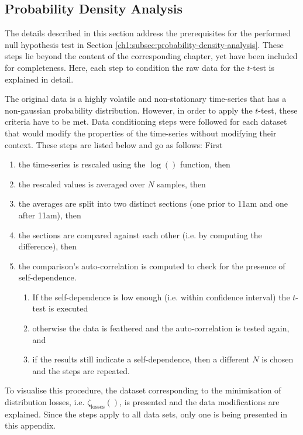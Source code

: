 \subsection{Probability Density Analysis}
\label{appx-a:ch1:probability-density-analysis}

The details described in this section address the prerequisites for the performed null hypothesis test in Section \ref{ch1:subsec:probability-density-analysis}.
These steps lie beyond the content of the corresponding chapter, yet have been included for completeness.
Here, each step to condition the raw data for the $t$-test is explained in detail.

The original data is a highly volatile and non-stationary time-series that has a non-gaussian probability distribution.
However, in order to apply the $t$-test, these criteria have to be met.
Data conditioning steps were followed for each dataset that would modify the properties of the time-series without modifying their context.
These steps are listed below and go as follows: First

\begin{enumerate}
	\item the time-series is rescaled using the $\log()$ function, then
	\item the rescaled values is averaged over $N$ samples, then
	\item the averages are split into two distinct sections (one prior to 11am and one after 11am), then
	\item the sections are compared against each other (i.e. by computing the difference), then
	\item the comparison's auto-correlation is computed to check for the presence of self-dependence.
	\begin{enumerate}
		\item If the self-dependence is low enough (i.e. within confidence interval) the $t$-test is executed
		\item otherwise the data is feathered and the auto-correlation is tested again, and
		\item if the results still indicate a self-dependence, then a different $N$ is chosen and the steps are repeated.
	\end{enumerate}
\end{enumerate}

To visualise this procedure, the dataset corresponding to the minimisation of distribution losses, i.e. $\zeta_\text{losses}()$, is presented and the data modifications are explained.
Since the steps apply to all data sets, only one is being presented in this appendix.

